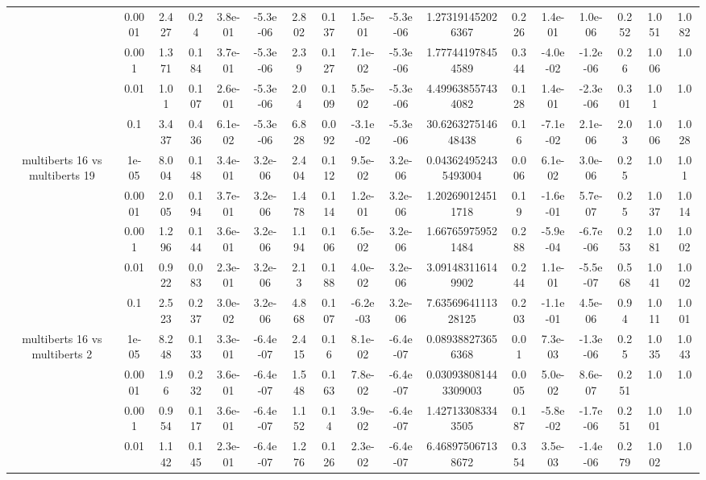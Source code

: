 \begin{tabular}{|c|c|c|c|c|c|c|c|c|c|c|c|c|c|c|c|c|}
 & 0.0001 & 2.427 & 0.24 & 3.8e-01 & -5.3e-06 & 2.802 & 0.137 & 1.5e-01 & -5.3e-06 & 1.273191452026367 & 0.226 & 1.4e-01 & 1.0e-06 & 0.252 & 1.051 & 1.082 \\
 & 0.001 & 1.371 & 0.184 & 3.7e-01 & -5.3e-06 & 2.39 & 0.127 & 7.1e-02 & -5.3e-06 & 1.777441978454589 & 0.344 & -4.0e-02 & -1.2e-06 & 0.26 & 1.006 & 1.0 \\
 & 0.01 & 1.01 & 0.107 & 2.6e-01 & -5.3e-06 & 2.04 & 0.109 & 5.5e-02 & -5.3e-06 & 4.499638557434082 & 0.128 & 1.4e-01 & -2.3e-06 & 0.301 & 1.01 & 1.0 \\
 & 0.1 & 3.437 & 0.436 & 6.1e-02 & -5.3e-06 & 6.828 & 0.092 & -3.1e-02 & -5.3e-06 & 30.626327514648438 & 0.16 & -7.1e-02 & 2.1e-06 & 2.03 & 1.006 & 1.028 \\
\hline
\multirow{5}{*}{multiberts 16 vs multiberts 19} & 1e-05 & 8.004 & 0.148 & 3.4e-01 & 3.2e-06 & 2.404 & 0.112 & 9.5e-02 & 3.2e-06 & 0.043624952435493004 & 0.006 & 6.1e-02 & 3.0e-06 & 0.25 & 1.0 & 1.01 \\
 & 0.0001 & 2.005 & 0.194 & 3.7e-01 & 3.2e-06 & 1.478 & 0.114 & 1.2e-01 & 3.2e-06 & 1.202690124511718 & 0.19 & -1.6e-01 & 5.7e-07 & 0.25 & 1.037 & 1.014 \\
 & 0.001 & 1.296 & 0.144 & 3.6e-01 & 3.2e-06 & 1.194 & 0.106 & 6.5e-02 & 3.2e-06 & 1.667659759521484 & 0.288 & -5.9e-04 & -6.7e-06 & 0.253 & 1.081 & 1.002 \\
 & 0.01 & 0.922 & 0.083 & 2.3e-01 & 3.2e-06 & 2.13 & 0.188 & 4.0e-02 & 3.2e-06 & 3.091483116149902 & 0.244 & 1.1e-01 & -5.5e-07 & 0.568 & 1.041 & 1.002 \\
 & 0.1 & 2.523 & 0.237 & 3.0e-02 & 3.2e-06 & 4.868 & 0.107 & -6.2e-03 & 3.2e-06 & 7.6356964111328125 & 0.203 & -1.1e-01 & 4.5e-06 & 0.94 & 1.011 & 1.001 \\
\hline
\multirow{5}{*}{multiberts 16 vs multiberts 2} & 1e-05 & 8.248 & 0.133 & 3.3e-01 & -6.4e-07 & 2.415 & 0.16 & 8.1e-02 & -6.4e-07 & 0.089388273656368 & 0.01 & 7.3e-03 & -1.3e-06 & 0.25 & 1.035 & 1.043 \\
 & 0.0001 & 1.96 & 0.232 & 3.6e-01 & -6.4e-07 & 1.548 & 0.163 & 7.8e-02 & -6.4e-07 & 0.030938081443309003 & 0.005 & 5.0e-02 & 8.6e-07 & 0.251 & 1.0 & 1.0 \\
 & 0.001 & 0.954 & 0.117 & 3.6e-01 & -6.4e-07 & 1.152 & 0.14 & 3.9e-02 & -6.4e-07 & 1.427133083343505 & 0.187 & -5.8e-02 & -1.7e-06 & 0.251 & 1.001 & 1.0 \\
 & 0.01 & 1.142 & 0.145 & 2.3e-01 & -6.4e-07 & 1.276 & 0.126 & 2.3e-02 & -6.4e-07 & 6.468975067138672 & 0.354 & 3.5e-03 & -1.4e-06 & 0.279 & 1.002 & 1.0 \\

\end{tabular}
